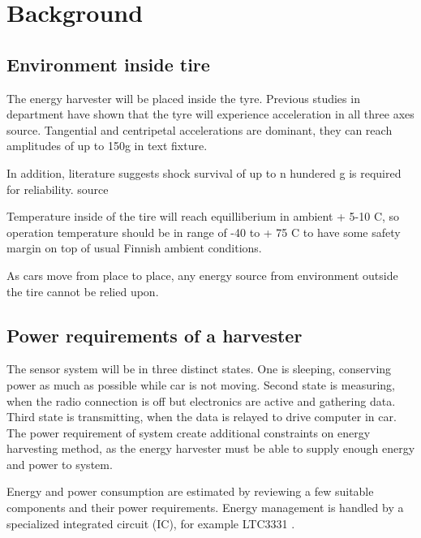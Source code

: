 \section{Background}

\subsection{Environment inside tire}
The energy harvester will be placed inside the tyre. Previous studies in department have shown
that the tyre will experience acceleration in all three axes {\color{red} source}. Tangential and centripetal accelerations are dominant,
they can reach amplitudes of up to 150g in text fixture. 

In addition, literature suggests shock survival of up to {\color{red}n hundered g} is required for reliability. {\color{red} source}

Temperature inside of the tire will reach equilliberium in ambient + 5-10 \degree C, so operation temperature should be
in range of -40 to + 75 \degree C to have some safety margin on top of usual Finnish ambient conditions.

As cars move from place to place, any energy source from environment outside the tire cannot be relied upon. 

\subsection{Power requirements of a harvester}
The sensor system will be in three distinct states. One is sleeping, conserving power as much as possible while car is not moving.
Second state is measuring, when the radio connection is off but electronics are active and gathering data.
Third state is transmitting, when the data is relayed to drive computer in car.\\

The power requirement of system create additional constraints on energy harvesting method, as the energy harvester must be able to supply enough energy and power to system. 

Energy and power consumption are estimated by reviewing a few suitable components and their power requirements. 
Energy management is handled by a specialized integrated circuit (IC), for example LTC3331 \cite[p. 2] {Technology}.

